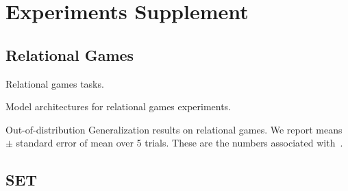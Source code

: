 \section{Experiments Supplement}\label{sec:experiments_supplement}

\subsection{Relational Games}

\begin{table}[ht]
    \centering
    
    \caption{Relational games tasks.}
    \label{tab:relational_games_tasks}
\end{table}

\begin{table}[ht]
    \centering
    
    \caption{Model architectures for relational games experiments.}
    \label{tab:architectures}
\end{table}


\begin{table}
    \centering
    
    \caption{Out-of-distribution Generalization results on relational games. We report means $\pm$ standard error of mean over 5 trials. These are the numbers associated with~.}\label{tab:ood_generalization}
\end{table}

\subsection{SET}